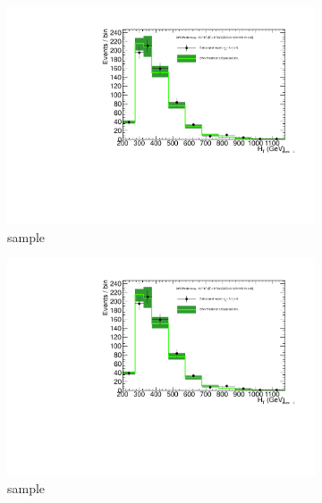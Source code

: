 \begin{figure}[h!]
\begin{subfigure}[b]{0.48\textwidth}
    \includegraphics[width=\textwidth,page=4]
    {Figs/results/v0/greenBand/bestFit_2012dev_RQcdZero_fZinvAll_1b_ge4j-12p_smOnly}
    \caption{\mj sample}
  \end{subfigure}
  \begin{subfigure}[b]{0.48\textwidth}
    \includegraphics[width=\textwidth,page=8]
    {Figs/results/v0/greenBand/bestFit_2012dev_RQcdZero_fZinvAll_1b_ge4j-12p_smOnly}
    \caption{\mmj sample}
  \end{subfigure}\\
  \begin{subfigure}[b]{0.48\textwidth}

\end{subfigure}
\end{figure}
